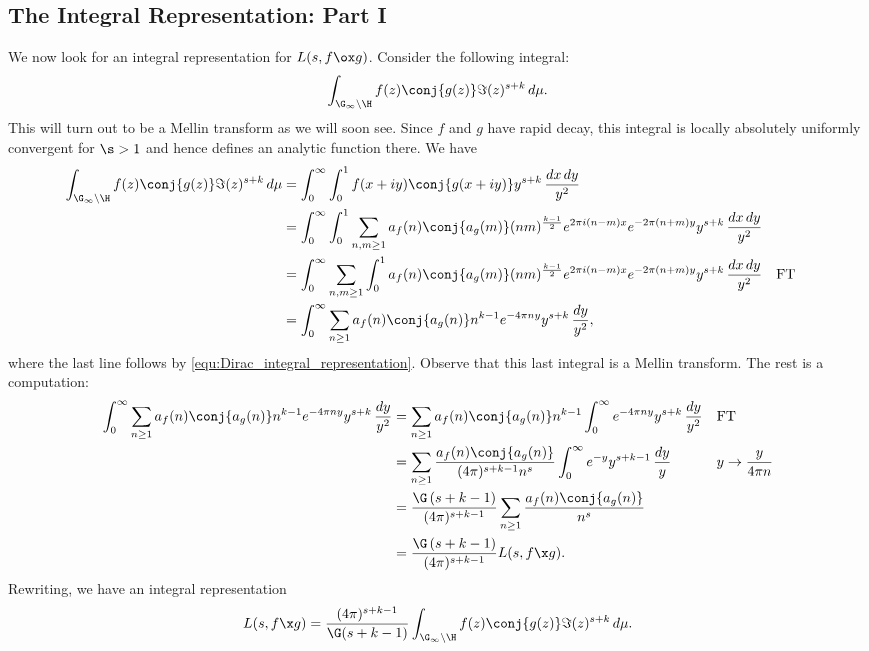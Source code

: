     \subsection*{The Integral Representation: Part I}
      We now look for an integral representation for $L(s,f \ox g)$. Consider the following integral:
      \[
        \int_{\G_{\infty}\backslash\H}f(z)\conj{g(z)}\Im(z)^{s+k}\,d\mu.
      \]
      This will turn out to be a Mellin transform as we will soon see. Since $f$ and $g$ have rapid decay, this integral is locally absolutely uniformly convergent for $\s > 1$ and hence defines an analytic function there. We have
      \begin{align*}
        \int_{\G_{\infty}\backslash\H}f(z)\conj{g(z)}\Im(z)^{s+k}\,d\mu &= \int_{0}^{\infty}\int_{0}^{1}f(x+iy)\conj{g(x+iy)}y^{s+k}\,\frac{dx\,dy}{y^{2}} \\
        &= \int_{0}^{\infty}\int_{0}^{1}\sum_{n,m \ge 1}a_{f}(n)\conj{a_{g}(m)}(nm)^{\frac{k-1}{2}}e^{2\pi i(n-m)x}e^{-2\pi(n+m)y}y^{s+k}\,\frac{dx\,dy}{y^{2}} \\
        &= \int_{0}^{\infty}\sum_{n,m \ge 1}\int_{0}^{1}a_{f}(n)\conj{a_{g}(m)}(nm)^{\frac{k-1}{2}}e^{2\pi i(n-m)x}e^{-2\pi(n+m)y}y^{s+k}\,\frac{dx\,dy}{y^{2}} && \text{FT} \\
        &= \int_{0}^{\infty}\sum_{n \ge 1}a_{f}(n)\conj{a_{g}(n)}n^{k-1}e^{-4\pi ny}y^{s+k}\,\frac{dy}{y^{2}},
      \end{align*}
      where the last line follows by \cref{equ:Dirac_integral_representation}. Observe that this last integral is a Mellin transform. The rest is a computation:
      \begin{align*}
        \int_{0}^{\infty}\sum_{n \ge 1}a_{f}(n)\conj{a_{g}(n)}n^{k-1}e^{-4\pi ny}y^{s+k}\,\frac{dy}{y^{2}} &= \sum_{n \ge 1}a_{f}(n)\conj{a_{g}(n)}n^{k-1}\int_{0}^{\infty}e^{-4\pi ny}y^{s+k}\,\frac{dy}{y^{2}} &&\text{FT} \\
        &= \sum_{n \ge 1}\frac{a_{f}(n)\conj{a_{g}(n)}}{(4\pi)^{s+k-1}n^{s}}\int_{0}^{\infty}e^{-y}y^{s+k-1}\,\frac{dy}{y} &&\text{$y \to \frac{y}{4\pi n}$} \\
        &= \frac{\G\left(s+k-1\right)}{(4\pi)^{s+k-1}}\sum_{n \ge 1}\frac{a_{f}(n)\conj{a_{g}(n)}}{n^{s}} \\
        &= \frac{\G\left(s+k-1\right)}{(4\pi)^{s+k-1}}L(s,f \x g).
      \end{align*}
      Rewriting, we have an integral representation
      \[
        L(s,f \x g) = \frac{(4\pi)^{s+k-1}}{\G(s+k-1)}\int_{\G_{\infty}\backslash\H}f(z)\conj{g(z)}\Im(z)^{s+k}\,d\mu.
      \]
